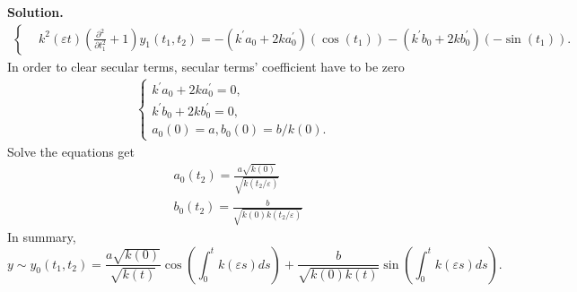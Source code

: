 \documentclass[a4paper]{book}
\newenvironment{solution}%
{\noindent\textbf{Solution.}}%
{\qedhere}
\numberwithin{equation}{chapter}
\theoremstyle{definition}
\begin{document}
\begin{solution}
\begin{align*}
\begin{cases}
      &k^2(\varepsilon t) (\frac{\partial^2}{\partial t_1^2} + 1)y_1(t_1,t_2) = -(k^\prime a_0 + 2 k a_0^\prime  ) (\cos(t_1)) - (k^\prime b_0 + 2 k b_0^\prime) (-\sin(t_1)).  
    \end{cases}
  \end{align*}
  In order to clear secular terms, secular terms' coefficient have to be zero
  \begin{align*}
    \begin{cases}
      k^\prime a_0 + 2 k a_0^\prime  = 0, \\
      k^\prime b_0 + 2 k b_0^\prime = 0, \\
      a_0(0) = a, b_0(0) = b/k(0).
    \end{cases}
  \end{align*}
  Solve the equations get
  \begin{align*}
    &a_0(t_2) = \frac{a  \sqrt{k(0)}}{\sqrt{k(t_2/\varepsilon)}} \\
    &b_0(t_2) = \frac{b}{\sqrt{k(0)k(t_2/\varepsilon)}} 
  \end{align*}
  In summary,
  \[y \sim y_0(t_1,t_2) = \frac{a  \sqrt{k(0)}}{\sqrt{k(t)}} \cos(\int_0^t k(\varepsilon s)ds) + \frac{b}{\sqrt{k(0)k(t)}} \sin(\int_0^t k(\varepsilon s)ds).\]
\end{solution}








%   

%   

%   


\end{document}
